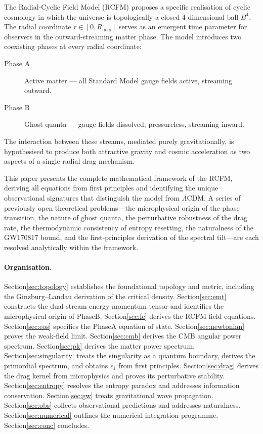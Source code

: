 \documentclass[10pt,twocolumn]{article}
\theoremstyle{definition}
\newcommand{\Rmax}{R_{\max}}
\begin{document}
The Radial-Cyclic Field Model (RCFM) proposes a specific
realisation of cyclic cosmology in which the universe is
topologically a closed 4-dimensional ball \( B^{4} \).  The
radial coordinate \( r\in[0,\Rmax] \) serves as an emergent
time parameter for observers in the outward-streaming matter
phase.  The model introduces two coexisting phases at every
radial coordinate:
\begin{description}
  \item[Phase A] Active matter --- all Standard Model gauge
    fields active, streaming outward.
  \item[Phase B] Ghost quanta --- gauge fields dissolved,
    pressureless, streaming inward.
\end{description}
The interaction between these streams, mediated purely
gravitationally, is hypothesised to produce both attractive
gravity and cosmic acceleration as two aspects of a single
radial drag mechanism.

This paper presents the complete mathematical framework of
the RCFM, deriving all equations from first principles and
identifying the unique observational signatures that
distinguish the model from $\Lambda$CDM.  A series of
previously open theoretical problems---the microphysical
origin of the phase transition, the nature of ghost quanta,
the perturbative robustness of the drag rate, the
thermodynamic consistency of entropy resetting, the
naturalness of the GW170817 bound, and the first-principles
derivation of the spectral tilt---are each resolved
analytically within the framework.

\paragraph{Organisation.}
Section\nobreakspace{}\ref{sec:topology} establishes the foundational
topology and metric, including the Ginzburg--Landau
derivation of the critical density.
Section\nobreakspace{}\ref{sec:emt} constructs the dual-stream
energy-momentum tensor and identifies the microphysical
origin of Phase\nobreakspace{}B.  Section\nobreakspace{}\ref{sec:fe} derives the RCFM
field equations.  Section\nobreakspace{}\ref{sec:eos} specifies the
Phase\nobreakspace{}A equation of state.  Section\nobreakspace{}\ref{sec:newtonian}
proves the weak-field limit.  Section\nobreakspace{}\ref{sec:cmb} derives
the CMB angular power spectrum.  Section\nobreakspace{}\ref{sec:pk}
derives the matter power spectrum.
Section\nobreakspace{}\ref{sec:singularity} treats the singularity as a
quantum boundary, derives the primordial spectrum, and
obtains \( \epsilon_{1} \) from first principles.
Section\nobreakspace{}\ref{sec:drag} derives the drag kernel from
microphysics and proves its perturbative stability.
Section\nobreakspace{}\ref{sec:entropy} resolves the entropy paradox and
addresses information conservation.  Section\nobreakspace{}\ref{sec:gw}
treats gravitational wave propagation.
Section\nobreakspace{}\ref{sec:obs} collects observational predictions
and addresses naturalness.  Section\nobreakspace{}\ref{sec:numerical}
outlines the numerical integration programme.
Section\nobreakspace{}\ref{sec:conc} concludes.
\end{document}
